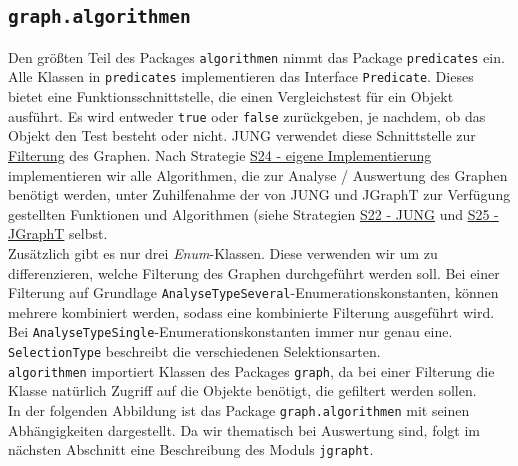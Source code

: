 \documentclass[enabledeprecatedfontcommands,fontsize=11pt,paper=a4,twoside]{scrartcl}
\newcounter{one}
\begin{document}
\subsection{\texttt{graph.algorithmen}}
Den größten Teil des Packages \texttt{algorithmen} nimmt das Package \texttt{predicates} ein. Alle Klassen in \texttt{predicates} implementieren das Interface \texttt{Predicate}. Dieses bietet eine Funktionsschnittstelle, die einen Vergleichstest für ein Objekt ausführt. Es wird entweder \texttt{true} oder \texttt{false} zurückgeben, je nachdem, ob das Objekt den Test besteht oder nicht. JUNG verwendet diese Schnittstelle zur \hyperlink{ss}{Filterung} des Graphen. Nach Strategie \hyperlink{eigeneImplementierung}{S24 - eigene Implementierung} implementieren wir alle Algorithmen, die zur Analyse / Auswertung des Graphen benötigt werden, unter Zuhilfenahme der von JUNG und JGraphT zur Verfügung gestellten Funktionen und Algorithmen (siehe Strategien \hyperlink{fff}{S22  - JUNG} und \hyperlink{xxx}{S25 - JGraphT} selbst.\\

Zusätzlich gibt es nur drei \textit{Enum}-Klassen. Diese verwenden wir um zu differenzieren, welche Filterung des Graphen durchgeführt werden soll. Bei einer Filterung auf Grundlage \texttt{AnalyseTypeSeveral}-Enumerationskonstanten, können mehrere kombiniert werden, sodass eine kombinierte Filterung ausgeführt wird. Bei \texttt{AnalyseTypeSingle}-Enumerationskonstanten immer nur genau eine. \texttt{SelectionType} beschreibt die verschiedenen Selektionsarten. \\

\texttt{algorithmen} importiert Klassen des Packages \texttt{graph}, da bei einer Filterung die Klasse natürlich Zugriff auf die Objekte benötigt, die gefiltert werden sollen.\\

In der folgenden Abbildung ist das Package \texttt{graph.algorithmen} mit seinen Abhängigkeiten dargestellt. Da wir thematisch bei Auswertung sind, folgt im nächsten Abschnitt eine Beschreibung des Moduls \texttt{jgrapht}.


\end{document}
